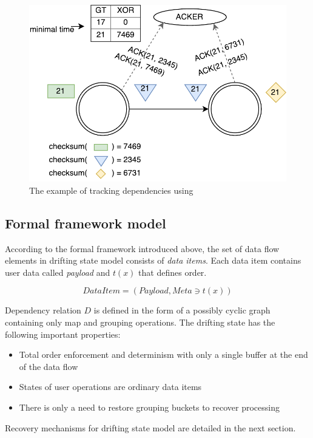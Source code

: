 \begin{figure}[htbp]
  \centering
  \includegraphics[width=.49\textwidth]{pics/acker}
  \caption{The example of tracking dependencies using~\Acker\ }
  \label {acker}
\end{figure}

\subsection{Formal framework model}

According to the formal framework introduced above, the set of data flow elements in drifting state model consists of {\em data items}. Each data item contains user data called {\em payload} and $t(x)$ that defines order.

$$DataItem=(Payload,Meta \ni t(x))$$

Dependency relation $D$ is defined in the form of a possibly cyclic graph containing only map and grouping operations. The drifting state has the following important properties:

\begin{itemize}
    \item Total order enforcement and determinism with only a single buffer at the end of the data flow
    \item States of user operations are ordinary data items
    \item There is only a need to restore grouping buckets to recover processing 
\end{itemize}

Recovery mechanisms for drifting state model are detailed in the next section.